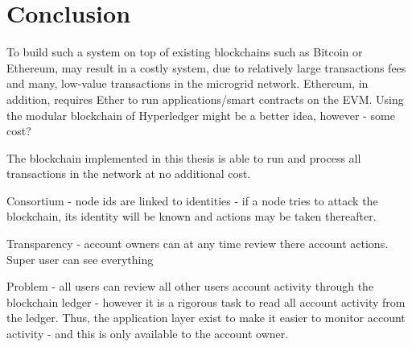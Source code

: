 \chapter{Conclusion}
To build such a system on top of existing blockchains such as Bitcoin or Ethereum, may result in a costly system, due to relatively large transactions fees and many, low-value transactions in the microgrid network. Ethereum, in addition, requires Ether to run applications/smart contracts on the EVM. Using the modular blockchain of Hyperledger might be a better idea, however - some cost?

The blockchain implemented in this thesis is able to run and process all transactions in the network at no additional cost.

Consortium - node ids are linked to identities - if a node tries to attack the blockchain, its identity will be known and actions may be taken thereafter. 

Transparency - account owners can at any time review there account actions. Super user can see everything

Problem - all users can review all other users account activity through the blockchain ledger - however it is a rigorous task to read all account activity from the ledger. Thus, the application layer exist to make it easier to monitor account activity - and this is only available to the account owner. 